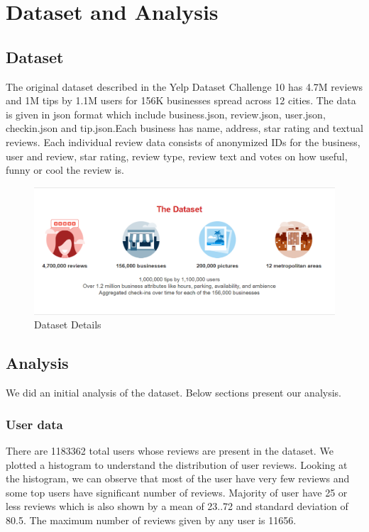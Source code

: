 \documentclass[11pt]{article}
\begin{document}
	\bigskip
	
	
	\section{Dataset and Analysis} 
		\subsection{Dataset}
		 The original dataset described in the Yelp Dataset Challenge 10 \cite{yelp} has 4.7M reviews and 1M tips by 1.1M users for 156K businesses spread across 12 cities. The 	data is given in json format which include business.json, review.json, user.json, checkin.json and tip.json.Each business has name, address, star rating and textual reviews. Each individual review data consists of anonymized IDs for the business, user and review, star rating, review type, review text and votes on how useful, funny or cool the review is.
		\begin{figure}[h]
				\centering
				\includegraphics[scale=0.5]{data_details.png}
				\caption{Dataset Details}
		\end{figure}
		\subsection{Analysis}
		We did an initial analysis of the dataset. Below sections present our analysis.
			\subsubsection{User data}
			There are 1183362 total users whose reviews are present in the dataset. We plotted a histogram to understand the distribution of user reviews. Looking at the histogram, we can observe that most of the user have very few reviews and some top users have significant number of reviews. Majority of user have 25 or less reviews which is also shown by a mean of 23..72 and standard deviation of 80.5. The maximum number of reviews given by any user is 11656.
		
\end{document}
